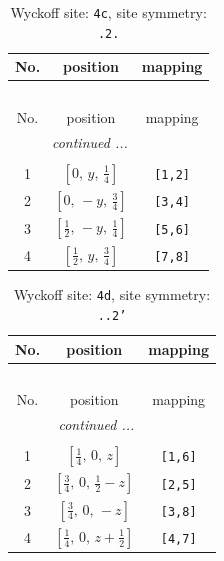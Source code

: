 \documentclass[fleqn,8pt]{jsarticle}
\begin{document}
\renewcommand{\arraystretch}{1.2}
\begin{longtable}{ccc}
\caption{Wyckoff site: {\tt 4c}, site symmetry: {\tt .2.}}
 \\
 \hline \hline
No. & position & mapping \\ \hline \endfirsthead

\multicolumn{2}{l}{\tablename\ \thetable{}} \\
 \hline \hline
No. & position & mapping \\ \hline \endhead

 \hline \hline
\multicolumn{2}{r}{\footnotesize\it continued ...} \\ \endfoot

 \hline \hline
\multicolumn{2}{r}{} \\ \endlastfoot

1 & $\left[ 0,\, y,\, \frac{1}{4} \right]$ & {\tt [1,2]} \\ \hline
2 & $\left[ 0,\, - y,\, \frac{3}{4} \right]$ & {\tt [3,4]} \\ \hline
3 & $\left[ \frac{1}{2},\, - y,\, \frac{1}{4} \right]$ & {\tt [5,6]} \\ \hline
4 & $\left[ \frac{1}{2},\, y,\, \frac{3}{4} \right]$ & {\tt [7,8]} \\
\end{longtable}
\renewcommand{\arraystretch}{1.2}
\begin{longtable}{ccc}
\caption{Wyckoff site: {\tt 4d}, site symmetry: {\tt ..2'}}
 \\
 \hline \hline
No. & position & mapping \\ \hline \endfirsthead

\multicolumn{2}{l}{\tablename\ \thetable{}} \\
 \hline \hline
No. & position & mapping \\ \hline \endhead

 \hline \hline
\multicolumn{2}{r}{\footnotesize\it continued ...} \\ \endfoot

 \hline \hline
\multicolumn{2}{r}{} \\ \endlastfoot

1 & $\left[ \frac{1}{4},\, 0,\, z \right]$ & {\tt [1,6]} \\ \hline
2 & $\left[ \frac{3}{4},\, 0,\, \frac{1}{2} - z \right]$ & {\tt [2,5]} \\ \hline
3 & $\left[ \frac{3}{4},\, 0,\, - z \right]$ & {\tt [3,8]} \\ \hline
4 & $\left[ \frac{1}{4},\, 0,\, z + \frac{1}{2} \right]$ & {\tt [4,7]} \\
\end{longtable}
\end{document}
